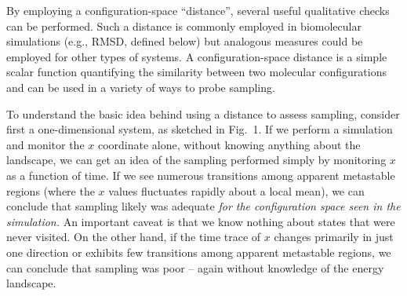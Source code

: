 By employing a configuration-space ``distance'', several useful qualitative checks can be performed.
Such a distance is commonly employed in biomolecular simulations (e.g., RMSD, defined below) but analogous measures could be employed for other types of systems.
A configuration-space distance is a simple scalar function quantifying the similarity between two molecular configurations and can be used in a variety of ways to probe sampling.    

To understand the basic idea behind using a distance to assess sampling, consider first a one-dimensional system, as sketched in Fig.\ 1.  If we perform a simulation and monitor the $x$ coordinate alone, without knowing anything about the landscape, we can get an idea of the sampling performed simply by monitoring $x$ as a function of time.  If we see numerous transitions among apparent metastable regions (where the $x$ values fluctuates rapidly about a local mean), we can conclude that sampling likely was adequate \emph{for the configuration space seen in the simulation.}  An important caveat is that we know nothing about states that were never visited.  On the other hand, if the time trace of $x$ changes primarily in just one direction or exhibits few transitions among apparent metastable regions, we can conclude that sampling was poor -- again without knowledge of the energy landscape.

